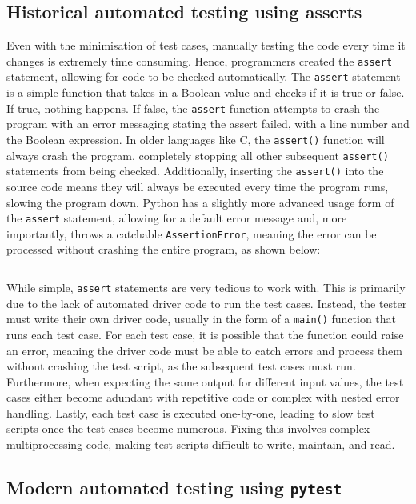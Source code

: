 \documentclass[11pt]{article}
\begin{document}
\subsection{Historical automated testing using asserts}

Even with the minimisation of test cases, manually testing the code every time it changes is extremely time consuming. Hence, programmers created the \texttt{assert} statement, allowing for code to be checked automatically. The \texttt{assert} statement is a simple function that takes in a Boolean value and checks if it is true or false. If true, nothing happens. If false, the \texttt{assert} function attempts to crash the program with an error messaging stating the assert failed, with a line number and the Boolean expression. In older languages like C, the \texttt{assert()} function will always crash the program, completely stopping all other subsequent \texttt{assert()} statements from being checked. Additionally, inserting the \texttt{assert()} into the source code means they will always be executed every time the program runs, slowing the program down. Python has a slightly more advanced usage form of the \texttt{assert} statement, allowing for a default error message and, more importantly, throws a catchable \texttt{AssertionError}, meaning the error can be processed without crashing the entire program, as shown below:

\inputminted[linenos=true]{python}{python_examples/assert_example.py}

While simple, \texttt{assert} statements are very tedious to work with. This is primarily due to the lack of automated driver code to run the test cases. Instead, the tester must write their own driver code, usually in the form of a \texttt{main()} function that runs each test case. For each test case, it is possible that the function could raise an error, meaning the driver code must be able to catch errors and process them without crashing the test script, as the subsequent test cases must run. Furthermore, when expecting the same output for different input values, the test cases either become adundant with repetitive code or complex with nested error handling. Lastly, each test case is executed one-by-one, leading to slow test scripts once the test cases become numerous. Fixing this involves complex multiprocessing code, making test scripts difficult to write, maintain, and read.

\subsection{Modern automated testing using \texttt{pytest}}
\end{document}
